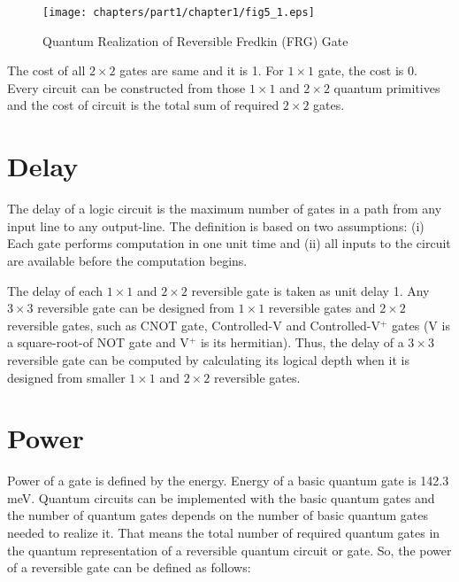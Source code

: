 \begin{figure}[H]
	\centering
	\texttt{[image: chapters/part1/chapter1/fig5\_1.eps]}
	\caption{Quantum Realization of Reversible Fredkin (FRG) Gate}
	\label{fig:p1_c1_fig5_1}
\end{figure}
\begin{example}\textnormal{
	The cost of all $2 \times 2$ gates are same and it is 1. For $1 \times 1$ gate, the cost is 0. Every circuit can be constructed from those $1 \times 1$ and $2 \times 2$ quantum primitives and the cost of circuit is the total sum of required $2 \times 2$ gates.}
\end{example}
\section{Delay}
The delay of a logic circuit is the maximum number of gates in a path from any input line to any output-line. The definition is based on two assumptions: (i) Each gate performs computation in one unit time and (ii) all inputs to the circuit are available before the computation begins.


\begin{example}\textnormal{
	The delay of each $1 \times 1$ and $2 \times 2$ reversible gate is taken as unit delay 1. Any $3 \times 3$ reversible gate can be designed from $1 \times 1$ reversible gates and $2\times 2$ reversible gates, such as CNOT gate, Controlled-V and Controlled-V$^+$ gates (V is a square-root-of NOT gate and V$^+$ is its hermitian). Thus, the delay of a $3 \times 3$ reversible gate can be computed by calculating its logical depth when it is designed from smaller $1 \times 1$ and $2 \times 2$ reversible gates.}
\end{example}

\section{Power}
Power of a gate is defined by the energy. Energy of a basic quantum gate is 142.3 meV. Quantum circuits can be implemented with the basic quantum gates and the number of quantum gates depends on the number of basic quantum gates needed to realize it. That means  the total number of required quantum gates in the quantum representation of a reversible quantum circuit or gate. So, the power of a reversible gate can be defined as follows: 


